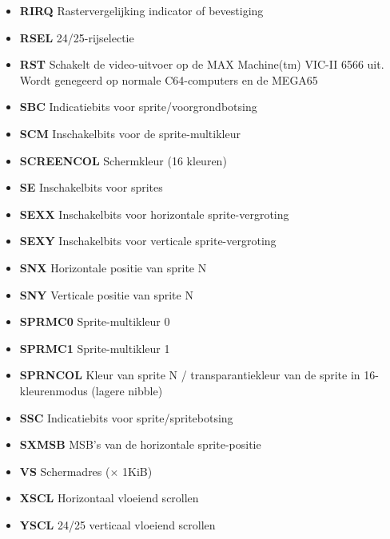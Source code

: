 \begin{itemize}
\item{\bf{RIRQ}} Rastervergelijking indicator of bevestiging
\item{\bf{RSEL}} 24/25-rijselectie
\item{\bf{RST}} Schakelt de video-uitvoer op de MAX Machine(tm) VIC-II 6566 uit. Wordt genegeerd op normale C64-computers en de MEGA65
\item{\bf{SBC}} Indicatiebits voor sprite/voorgrondbotsing
\item{\bf{SCM}} Inschakelbits voor de sprite-multikleur
\item{\bf{SCREENCOL}} Schermkleur (16 kleuren)
\item{\bf{SE}} Inschakelbits voor sprites
\item{\bf{SEXX}} Inschakelbits voor horizontale sprite-vergroting
\item{\bf{SEXY}} Inschakelbits voor verticale sprite-vergroting
\item{\bf{SNX}} Horizontale positie van sprite N
\item{\bf{SNY}} Verticale positie van sprite N
\item{\bf{SPRMC0}} Sprite-multikleur 0
\item{\bf{SPRMC1}} Sprite-multikleur 1
\item{\bf{SPRNCOL}} Kleur van sprite N / transparantiekleur van de sprite in 16-kleurenmodus (lagere nibble)
\item{\bf{SSC}} Indicatiebits voor sprite/spritebotsing
\item{\bf{SXMSB}} MSB's van de horizontale sprite-positie
\item{\bf{VS}} Schermadres ($\times$ 1KiB)
\item{\bf{XSCL}} Horizontaal vloeiend scrollen
\item{\bf{YSCL}} 24/25 verticaal vloeiend scrollen
\end{itemize}
